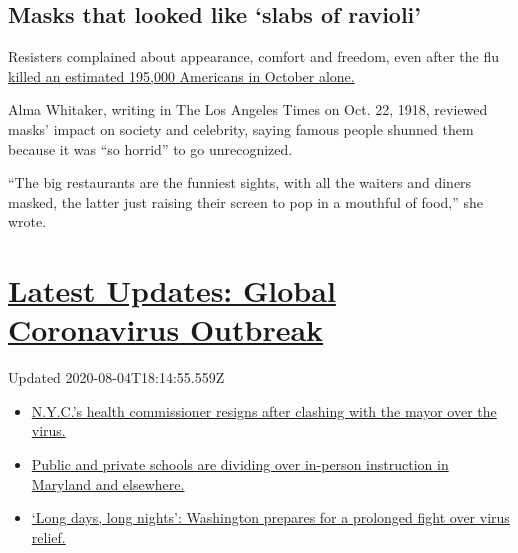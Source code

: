 \hypertarget{masks-that-looked-like-slabs-of-ravioli}{%
\subsection{Masks that looked like `slabs of
ravioli'}\label{masks-that-looked-like-slabs-of-ravioli}}

Resisters complained about appearance, comfort and freedom, even after
the flu
\href{https://www.cdc.gov/flu/pandemic-resources/1918-commemoration/pandemic-timeline-1918.htm}{killed
an estimated 195,000 Americans in October alone.}

Alma Whitaker, writing in The Los Angeles Times on Oct. 22, 1918,
reviewed masks' impact on society and celebrity, saying famous people
shunned them because it was ``so horrid'' to go unrecognized.

``The big restaurants are the funniest sights, with all the waiters and
diners masked, the latter just raising their screen to pop in a mouthful
of food,'' she wrote.

\hypertarget{latest-updates-global-coronavirus-outbreak}{%
\section{\texorpdfstring{\href{https://www.nytimes.com/2020/08/04/world/coronavirus-cases.html?action=click\&pgtype=Article\&state=default\&region=MAIN_CONTENT_1\&context=storylines_live_updates}{Latest
Updates: Global Coronavirus
Outbreak}}{Latest Updates: Global Coronavirus Outbreak}}\label{latest-updates-global-coronavirus-outbreak}}

Updated 2020-08-04T18:14:55.559Z

\begin{itemize}
\tightlist
\item
  \href{https://www.nytimes.com/2020/08/04/world/coronavirus-cases.html?action=click\&pgtype=Article\&state=default\&region=MAIN_CONTENT_1\&context=storylines_live_updates\#link-4d1eafa8}{N.Y.C.'s
  health commissioner resigns after clashing with the mayor over the
  virus.}
\item
  \href{https://www.nytimes.com/2020/08/04/world/coronavirus-cases.html?action=click\&pgtype=Article\&state=default\&region=MAIN_CONTENT_1\&context=storylines_live_updates\#link-18bf040e}{Public
  and private schools are dividing over in-person instruction in
  Maryland and elsewhere.}
\item
  \href{https://www.nytimes.com/2020/08/04/world/coronavirus-cases.html?action=click\&pgtype=Article\&state=default\&region=MAIN_CONTENT_1\&context=storylines_live_updates\#link-6b644638}{`Long
  days, long nights': Washington prepares for a prolonged fight over
  virus relief.}
\end{itemize}

